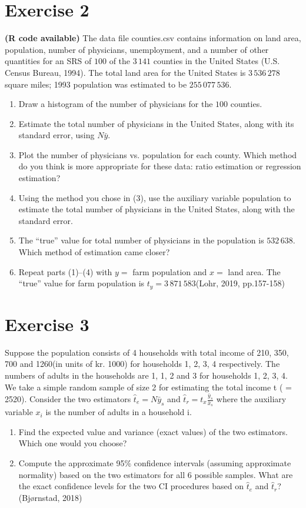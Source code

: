 \documentclass[12pt]{article}
\begin{document}
\section*{Exercise 2}
\textbf{\color{ForestGreen}(R code available)}  The data file counties.csv contains information on land area, population, number of physicians, unemployment, and a number of other quantities for an SRS of $100$ of the
$3\,141$ counties in the United States (U.S. Census Bureau, 1994). The total land area
for the United States is $3\,536\,278$ square miles; 1993 population was estimated to be $255\,077\,536$.
\begin{enumerate}
\item Draw a histogram of the number of physicians for the $100$ counties.
\item Estimate the total number of physicians in the United States, along with its standard
error, using $N\bar{y}$.
\item Plot the number of physicians vs. population for each county. Which method
do you think is more appropriate for these data: ratio estimation or regression
estimation?
\item Using the method you chose in (3), use the auxiliary variable population to estimate
the total number of physicians in the United States, along with the standard error.
\item The “true” value for total number of physicians in the population is $532\,638$.
Which method of estimation came closer? 
\item Repeat parts (1)–(4) with $y=$ farm population and $x=$ land area. The “true” value for farm population is $t_y=3\,871\,583$\hfill (Lohr, 2019, pp.157-158)
\end{enumerate}

\section*{Exercise 3}
Suppose the population consists of 4 households with total income of 210, 350, 700 and 1260(in units of kr. 1000) for households 1, 2, 3, 4 respectively. The numbers of adults in the households are 1, 1, 2 and 3 for households 1, 2, 3, 4. We take a simple random sample of size 2 for estimating the total income t ( = 2520). Consider the two estimators $\hat{t}_e = N\bar{y}_s$ and  $\hat{t}_r = t_x\frac{\bar{y}_s}{\bar{x}_s}$ where the auxiliary variable $x_i$ is the number of adults in a household i.
\begin{enumerate}
\item Find the expected value and variance (exact values) of the two estimators. Which one would you choose?
\item Compute the approximate 95\% confidence intervals (assuming approximate normality) based on the two estimators for all 6 possible samples. What are the exact confidence levels for the two CI procedures based on $\hat{t}_e$ and $\hat{t}_r$? \hfill(Bjørnstad, 2018)
\end{enumerate}
\end{document}
